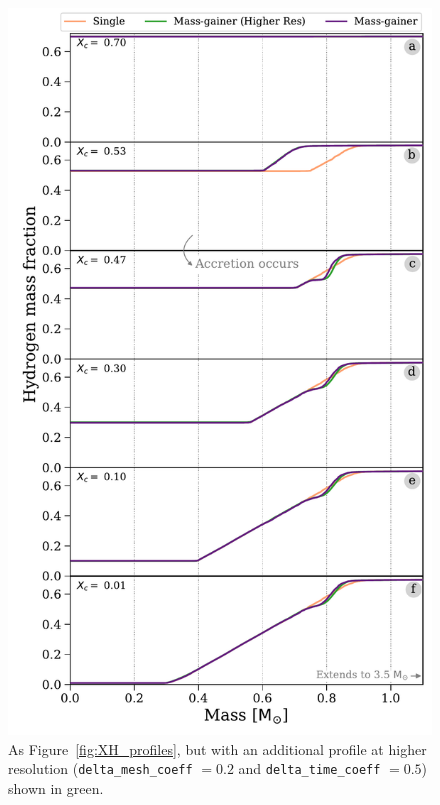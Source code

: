 \documentclass[twocolumn, twocolappendix, oneside]{aastex631}
\begin{document}
\begin{figure}
    \centering
    \includegraphics[width=\columnwidth]{figures/XH_profiles_convergence.pdf}
    \caption{As Figure~\ref{fig:XH_profiles}, but with an additional profile at higher resolution (\texttt{delta\_mesh\_coeff} $ = 0.2$ and \texttt{delta\_time\_coeff} $ = 0.5$) shown in green.}
    \label{fig:xh_convergence}
\end{figure}
\end{document}
